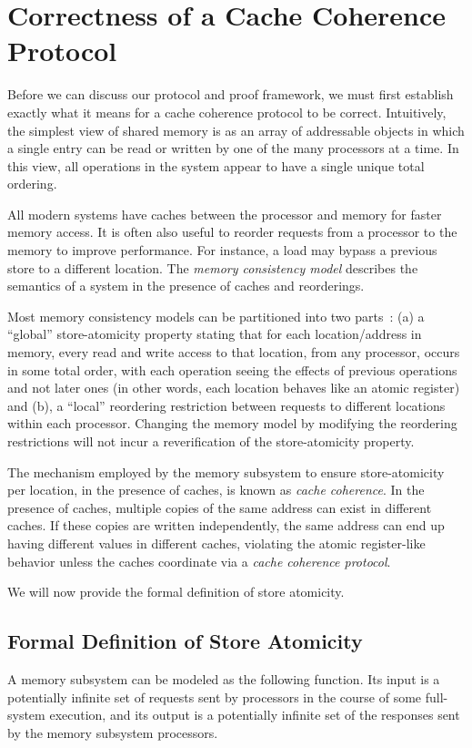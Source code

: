 \section{Correctness of a Cache Coherence Protocol}
\label{Background}

Before we can discuss our protocol and proof framework, we must first
establish exactly what it means for a cache coherence protocol to be
correct. Intuitively, the simplest view of shared memory is as an
array of addressable objects in which a single entry can be read or
written by one of the many processors at a time.  In this view, all
operations in the system appear to have a single unique total
ordering.

All modern systems have caches between the processor and memory for faster
memory access. It is often also useful to reorder requests from a processor to
the memory to improve performance. For instance, a load may bypass a previous
store to a different location. The \emph{memory consistency model} describes
the semantics of a system in the presence of caches and reorderings.

Most memory consistency models can be partitioned into two
parts~\cite{Arvind-memory-model}: (a) a ``global'' store-atomicity property
stating that for each location/address in memory, every read and write access
to that location, from any processor, occurs in some total order, with
each operation seeing the effects of previous operations and not later ones (in
other words, each location behaves like an atomic register) and (b), a
``local'' reordering restriction between requests to different locations within
each processor. Changing the memory model by modifying the reordering
restrictions will not incur a reverification of the store-atomicity property.

The mechanism employed by the memory subsystem to ensure store-atomicity per
location, in the presence of caches, is known as \emph{cache coherence}. In the
presence of caches, multiple copies of the same address can exist in different
caches. If these copies are written independently, the same address can end up
having different values in different caches, violating the atomic register-like
behavior unless the caches coordinate via a \emph{cache coherence protocol}.

We will now provide the formal definition of store atomicity.

\subsection{Formal Definition of Store Atomicity}
A memory subsystem can be modeled as the following function. Its input is a
potentially infinite set of requests sent by processors in the course of some
full-system execution, and its output is a potentially infinite set of
the responses sent by the memory subsystem processors.

